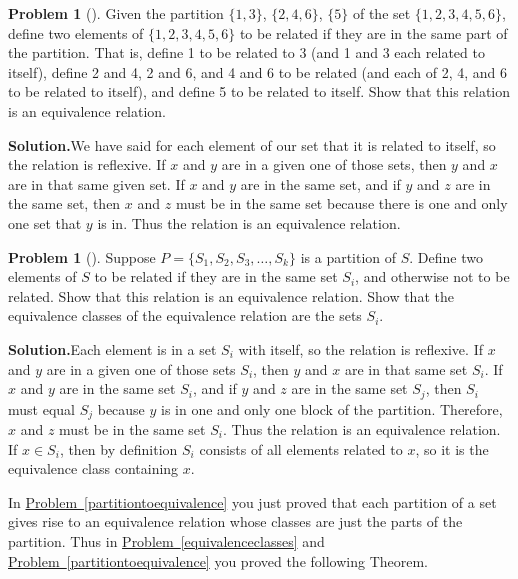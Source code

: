 \documentclass[10pt,]{book}
\theoremstyle{plain}
\theoremstyle{definition}
\newtheorem{activity}[project]{Problem}
\theoremstyle{definition}
\numberwithin{equation}{chapter}
\begin{document}
\begin{activity}[]\label{activity-354}
Given the partition \(\{1,3\}\), \(\{2,4,6\}\), \(\{5\}\) of the set \(\{1,2,3,4,5,6\}\), define two elements of \(\{1,2,3,4,5,6\}\) to be related if they are in the same part of the partition. That is, define 1 to be related to 3 (and 1 and 3 each related to itself), define 2 and 4, 2 and 6, and 4 and 6 to be related (and each of 2, 4, and 6 to be related to itself), and define 5 to be related to itself. Show that this relation is an equivalence relation.%
\par\medskip\noindent%
\textbf{Solution.}\quad We have said for each element of our set that it is related to itself, so the relation is reflexive. If \(x\) and \(y\) are in a given one of those sets, then \(y\) and \(x\) are in that same given set. If \(x\) and \(y\) are in the same set, and if \(y\) and \(z\) are in the same set, then \(x\) and \(z\) must be in the same set because there is one and only one set that \(y\) is in. Thus the relation is an equivalence relation.%
\end{activity}
\begin{activity}[]\label{activity-355}
Suppose \(P = \{S_1, S_2, S_3, \ldots, S_k\}\) is a partition of \(S\). Define two elements of \(S\) to be related if they are in the same set \(S_i\), and otherwise not to be related. Show that this relation is an equivalence relation. Show that the equivalence classes of the equivalence relation are the sets \(S_i\).%
\par\medskip\noindent%
\textbf{Solution.}\quad Each element is in a set \(S_i\) with itself, so the relation is reflexive. If \(x\) and \(y\) are in a given one of those sets \(S_i\), then \(y\) and \(x\) are in that same set \(S_i\). If \(x\) and \(y\) are in the same set \(S_i\), and if \(y\) and \(z\) are in the same set \(S_j\), then \(S_i\) must equal \(S_j\) because \(y\) is in one and only one block of the partition. Therefore, \(x\) and \(z\) must be in the same set \(S_i\). Thus the relation is an equivalence relation. If \(x\in S_i\), then by definition \(S_i\) consists of all elements related to \(x\), so it is the equivalence class containing \(x\).%
\end{activity}
In \hyperref[partitiontoequivalence]{Problem~\ref{partitiontoequivalence}} you just proved that each partition of a set gives rise to an equivalence relation whose classes are just the parts of the partition. Thus in \hyperref[equivalenceclasses]{Problem~\ref{equivalenceclasses}} and \hyperref[partitiontoequivalence]{Problem~\ref{partitiontoequivalence}} you proved the following Theorem.%
\end{document}
